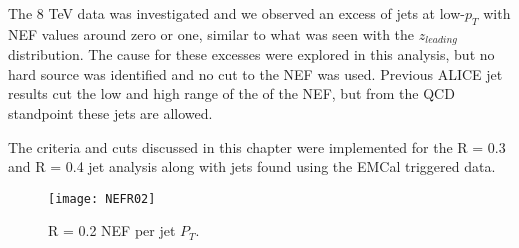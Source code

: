 The 8 TeV data was investigated and we observed an excess of jets at low-$p_{T}$ with NEF values around zero or one, similar to what was seen with the $z_{leading}$ distribution.  The cause for these excesses were explored in this analysis, but no hard source was identified and no cut to the NEF was used.  Previous ALICE jet results cut the low and high range of the of the NEF, but from the QCD standpoint these jets are allowed.

The criteria and cuts discussed in this chapter were implemented for the R = 0.3 and R = 0.4 jet analysis along with jets found using the EMCal triggered data.

\begin{figure}[h]
\texttt{[image: NEFR02]}
\centering
\caption{R = 0.2 NEF per jet $P_{T}$.}
\label{fig:JetNEF}
\end{figure}




